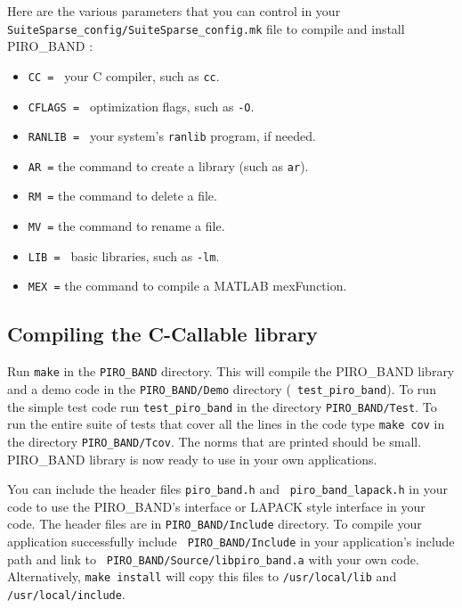 \documentclass[11pt]{article}
\begin{document}
\noindent
Here are the various parameters that you can control in your
{\tt SuiteSparse\_config/SuiteSparse\_config.mk}
file to compile and install PIRO\_BAND :
\begin{itemize}
\item {\tt CC = } your C compiler, such as {\tt cc}.
\item {\tt CFLAGS = } optimization flags, such as {\tt -O}.
\item {\tt RANLIB = } your system's {\tt ranlib} program, if needed.
\item {\tt AR =} the command to create a library (such as {\tt ar}).
\item {\tt RM =} the command to delete a file.
\item {\tt MV =} the command to rename a file.
\item {\tt LIB = } basic libraries, such as {\tt -lm}.
\item {\tt MEX =} the command to compile a MATLAB mexFunction.
\end{itemize}

\subsection{Compiling the C-Callable library}

Run {\tt make} in the {\tt PIRO\_BAND} directory. This will compile the
PIRO\_BAND library and a demo code in the {\tt PIRO\_BAND/Demo} directory ({\tt
test\_piro\_band}).
To run the simple test code run
{\tt test\_piro\_band} in the directory {\tt PIRO\_BAND/Test}.  To run the
entire suite of tests that cover all the lines in the code type {\tt make cov}
in the directory {\tt PIRO\_BAND/Tcov}. The norms that are printed should be
small.  PIRO\_BAND library is now ready to use in your own applications. 

You can include the header files {\tt piro\_band.h} and {\tt
piro\_band\_lapack.h} in your code to use the PIRO\_BAND's interface or LAPACK
style interface in your code. The header files are in {\tt PIRO\_BAND/Include}
directory. To compile your application successfully include {\tt
PIRO\_BAND/Include} in your application's include path and link to {\tt
PIRO\_BAND/Source/libpiro\_band.a} with your own code.   Alternatively,
{\tt make install} will copy this files to {\tt /usr/local/lib}
and {\tt /usr/local/include}.
\end{document}
